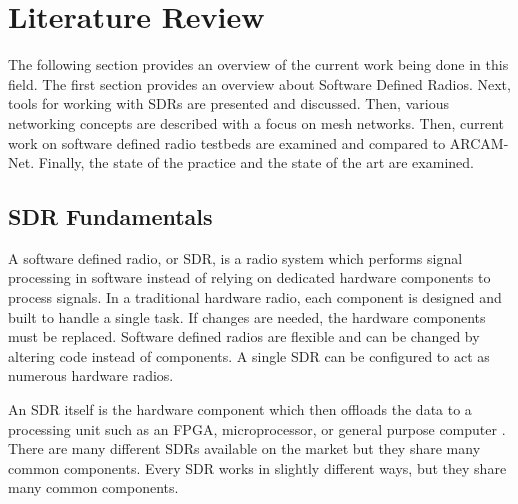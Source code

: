 
\chapter{Literature Review} %

\label{Chapter2} %

The following section provides an overview of the current work being done in this field. The first section provides an overview about Software Defined Radios. Next, tools for working with SDRs are presented and discussed. Then, various networking concepts are described with a focus on mesh networks. Then, current work on software defined radio testbeds are examined and compared to ARCAM-Net. Finally, the state of the practice and the state of the art are examined. 


\section{SDR Fundamentals}

A software defined radio, or SDR, is a radio system which performs signal processing in software instead of relying on dedicated hardware components to process signals. In a traditional hardware radio, each component is designed and built to handle a single task. If changes are needed, the hardware components must be replaced. Software defined radios are flexible and can be changed by altering code instead of components. A single SDR can be configured to act as numerous hardware radios. \cite{7043470} \cite{0018} 

An SDR itself is the hardware component which then offloads the data to a processing unit such as an FPGA, microprocessor, or general purpose computer \cite{7043470} \cite{0018}. There are many different SDRs available on the market but they share many common components. Every SDR works in slightly different ways, but they share many common components. 

